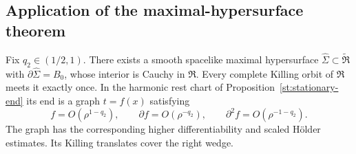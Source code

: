 \subsection{Application of the maximal-hypersurface theorem}

\begin{proposition}\label{st:maximal-slice}
Fix $q_2\in(1/2,1)$.  There exists a smooth spacelike maximal hypersurface
$\widehat\Sigma\subset\widetilde{\mathfrak R}$ with
$\partial\widehat\Sigma=B_0$, whose interior is Cauchy in
$\mathfrak R$.  Every complete Killing orbit of $\mathfrak R$
meets it exactly once.  In the harmonic rest chart of
Proposition~\ref{st:stationary-end} its end is a graph $t=f(x)$ satisfying
\begin{equation}\label{st:maximal-decay}
 f=O(\rho^{1-q_2}),\qquad
 \partial f=O(\rho^{-q_2}),\qquad
 \partial^2 f=O(\rho^{-1-q_2}).
\end{equation}
The graph has the corresponding higher differentiability and scaled
H\"older estimates.  Its Killing translates cover the right wedge.
\end{proposition}

